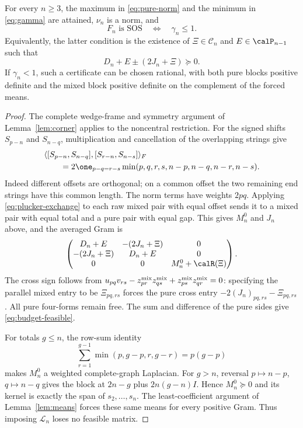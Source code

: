 \begin{theorem}\label{thm:exchange}
For every $n\ge3$, the maximum in \eqref{eq:pure-norm} and the minimum in
\eqref{eq:gamma} are attained, $\nu_n$ is a norm, and
\[
                         F_n\text{ is SOS}\quad\Longleftrightarrow\quad\gamma_n\le1.
\]
Equivalently, the latter condition is the existence of
$\Xi\in\mathcal C_n$ and $E\in\calP_{n-1}$ such that
\begin{equation}\label{eq:budget-feasible}
                    D_n+E\pm(2J_n+\Xi)\succeq0.
\end{equation}
If $\gamma_n<1$, such a certificate can be chosen rational, with both
pure blocks positive definite and the mixed block positive definite on
the complement of the forced means.
\end{theorem}
\begin{proof}
The complete wedge-frame and symmetry argument of
Lemma~\ref{lem:corner} applies to the noncentral restriction.
For the signed shifts $S_{p-n}$ and $S_{n-q}$, multiplication and
cancellation of the overlapping strings give
\[
 \begin{split}
 &\langle[S_{p-n},S_{n-q}],[S_{r-n},S_{n-s}]\rangle_F\\
 &\qquad=2\one_{p-q=r-s}
       \min(p,q,r,s,n-p,n-q,n-r,n-s).
 \end{split}
\]
Indeed different offsets are orthogonal; on a common offset the two
remaining end strings have this common length. The norm terms have
weights $2pq$. Applying \eqref{eq:plucker-exchange} to each raw mixed
pair with equal offset sends it to a mixed pair with equal total and
a pure pair with equal gap. This gives $M_n^0$ and $J_n$ above, and the
averaged Gram is
\[
 \begin{pmatrix}
 D_n+E&-(2J_n+\Xi)&0\\
 -(2J_n+\Xi)&D_n+E&0\\
 0&0&M_n^0+\calR(\Xi)
 \end{pmatrix}.
\]
The cross sign follows from
$u_{pq}v_{rs}-z^{\rm mix}_{pr}z^{\rm mix}_{qs}+z^{\rm mix}_{ps}z^{\rm mix}_{qr}=0$: specifying the parallel
mixed entry to be $\Xi_{pq,rs}$ forces the pure cross entry
$-2(J_n)_{pq,rs}-\Xi_{pq,rs}$. All pure four-forms remain free.
The sum and difference of the pure sides give
\eqref{eq:budget-feasible}.

For totals $g\le n$, the row-sum identity
\[
 \sum_{r=1}^{g-1}\min(p,g-p,r,g-r)=p(g-p)
\]
makes $M_n^0$ a weighted complete-graph Laplacian. For $g>n$, reversal
$p\mapsto n-p$, $q\mapsto n-q$ gives the block at $2n-g$ plus
$2n(g-n)I$. Hence $M_n^0\succeq0$ and its kernel is exactly the span
of $s_2,\ldots,s_n$. The least-coefficient argument of
Lemma~\ref{lem:means} forces these same means for every positive Gram.
Thus imposing $\mathcal L_n$ loses no feasible matrix.


\end{proof}
